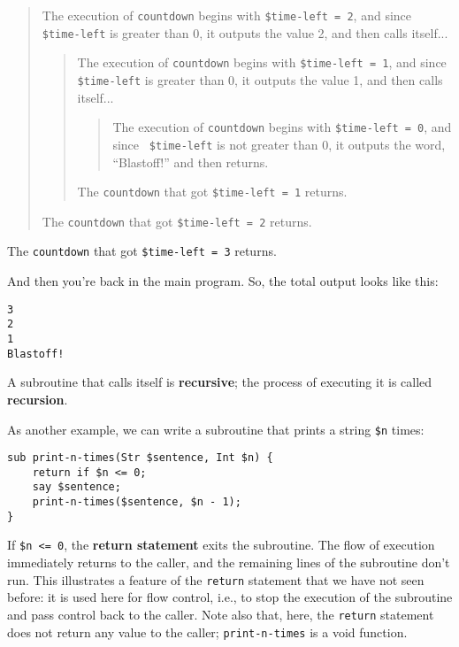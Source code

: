 \begin{quote}
The execution of {\tt countdown} begins with {\tt \$time-left = 2}, and since
{\tt \$time-left} is greater than 0, it outputs the value 2, and then calls itself...

\begin{quote}
The execution of {\tt countdown} begins with {\tt \$time-left = 1}, and since
{\tt \$time-left} is greater than 0, it outputs the value 1, and then calls itself...

\begin{quote}
The execution of {\tt countdown} begins with {\tt \$time-left = 0}, and since {\tt
\$time-left} is not greater than 0, it outputs the word, ``Blastoff!'' and then
returns.
\end{quote}

The {\tt countdown} that got {\tt \$time-left = 1} returns.
\end{quote}

The {\tt countdown} that got {\tt \$time-left = 2} returns.
\end{quote}

The {\tt countdown} that got {\tt \$time-left = 3} returns.

And then you're back in the main program.  So, the
total output looks like this:

\begin{verbatim}
3
2
1
Blastoff!
\end{verbatim}
%
A subroutine that calls itself is {\bf recursive}; the process of
executing it is called {\bf recursion}.

As another example, we can write a subroutine that prints a
string {\tt \$n} times:

\begin{verbatim}
sub print-n-times(Str $sentence, Int $n) {
    return if $n <= 0;
    say $sentence;
    print-n-times($sentence, $n - 1);
}
\end{verbatim}
%
If {\tt \$n <= 0}, the {\bf return statement} exits the
subroutine.  The flow of execution immediately returns to 
the caller, and the remaining lines of the subroutine don't
run. This illustrates a feature of the {\tt return} statement 
that we have not seen before: it is used here for flow 
control, i.e., to stop the execution of the subroutine and 
pass control back to the caller. Note also that, here, the 
{\tt return} statement does not return any value to the 
caller; {\tt print-n-times} is a void function.

